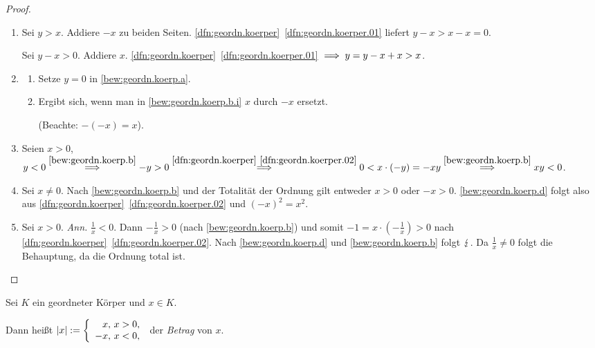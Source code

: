 \documentclass[12pt]{scrreprt}
\begin{document}
\begin{proof}
\begin{enumerate} %
\item\label{bew:geordn.koerp.a} Sei $y > x$. Addiere $-x$ zu beiden Seiten. \ref{dfn:geordn.koerper}~\ref{dfn:geordn.koerper.01} liefert $y - x > x - x = 0$.

Sei $y - x > 0$. Addiere $x$. \ref{dfn:geordn.koerper}~\ref{dfn:geordn.koerper.01} $\implies y = y - x + x > x$.

\item\label{bew:geordn.koerp.b} \begin{enumerate} %
	\item\label{bew:geordn.koerp.b.i} Setze $y = 0$ in \ref{bew:geordn.koerp.a}.
	\item Ergibt sich, wenn man in \ref{bew:geordn.koerp.b.i} $x$ durch $-x$ ersetzt.
  
	(Beachte: $-(-x) = x$).
\end{enumerate}

\item Seien $x > 0$, $y < 0 \stackrel{\ref{bew:geordn.koerp.b}}{\implies} -y > 0 \stackrel{\ref{dfn:geordn.koerper}~\ref{dfn:geordn.koerper.02}}{\implies} 0 < x \cdot (-y) = -xy \stackrel{\ref{bew:geordn.koerp.b}}{\implies} xy < 0$.

\item\label{bew:geordn.koerp.d} Sei $x\neq0$. Nach \ref{bew:geordn.koerp.b} und der Totalität der Ordnung gilt entweder $x>0$ oder $-x>0$. \ref{bew:geordn.koerp.d} folgt also aus \ref{dfn:geordn.koerper}~\ref{dfn:geordn.koerper.02} und $(-x)^2 = x^2$.

\item Sei $x>0$. \emph{Ann.} $\displaystyle\frac{1}{x} < 0$. Dann $\displaystyle-\frac{1}{x} > 0$ (nach \ref{bew:geordn.koerp.b}) und somit $\displaystyle-1 = x\cdot\left(-\frac{1}{x}\right) > 0$ nach \ref{dfn:geordn.koerper}~\ref{dfn:geordn.koerper.02}. Nach \ref{bew:geordn.koerp.d} und \ref{bew:geordn.koerp.b} folgt $\lightning$. Da $\displaystyle\frac{1}{x} \neq 0$ folgt die Behauptung, da die Ordnung total ist.
\end{enumerate}
\end{proof}

\begin{dfn}\label{dfn:betrag}
Sei $K$ ein geordneter Körper und $x \in K$.

Dann heißt $\displaystyle|x| := \left\{\begin{array}{r @{,\ } l}x&x>0,\\-x&x<0,\\\end{array}\right.$ der \emph{Betrag} von $x$.
\end{dfn}
\end{document}

